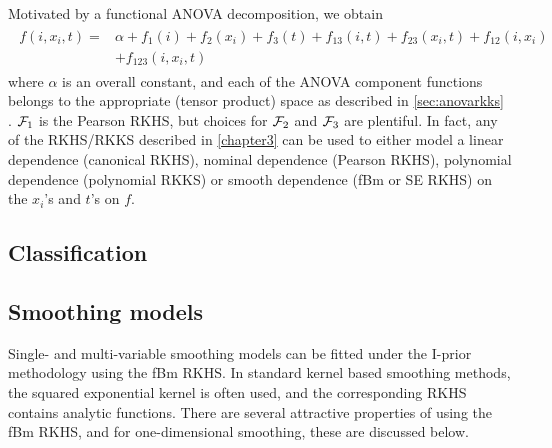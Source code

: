 Motivated by a functional ANOVA decomposition, we obtain
\begin{align}\label{eq:longitudinalanova}
\begin{split}
  f(i,x_i,t) 
  ={}& \alpha + f_1(i) + f_2(x_i) + f_3(t) + f_{13}(i,t) + f_{23}(x_i,t) + f_{12}(i,x_i)  \\
  &+ f_{123}(i,x_i,t)
\end{split}
\end{align}
where $\alpha$ is an overall constant, and each of the ANOVA component functions belongs to the appropriate (tensor product) space as described in \cref{sec:anovarkks} .
${\mathcal F}_1$ is the Pearson RKHS, but choices for ${\mathcal F}_2$ and ${\mathcal F}_3$ are plentiful.
In fact, any of the RKHS/RKKS described in \cref{chapter3} can be used to either model a linear dependence (canonical RKHS), nominal dependence (Pearson RKHS), polynomial dependence (polynomial RKKS) or smooth dependence (fBm or SE RKHS) on the $x_i$'s and $t$'s on $f$.

\subsection{Classification}
\label{sec:naiveclass}


\subsection{Smoothing models}

Single- and multi-variable smoothing models can be fitted under the I-prior methodology using the fBm RKHS.
In standard kernel based smoothing methods, the squared exponential kernel is often used, and the corresponding RKHS contains analytic functions.
There are several attractive properties of using the fBm RKHS, and for one-dimensional smoothing, these are discussed below.

